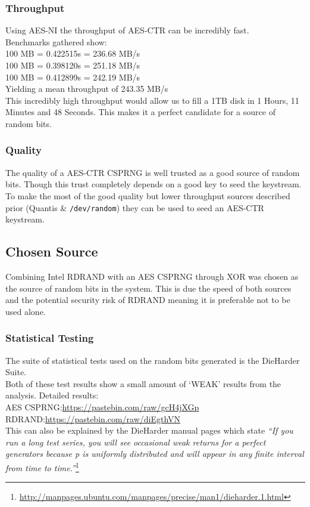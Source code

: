 \documentclass{paper}
\begin{document}
			\subsubsection{Throughput}
				Using AES-NI the throughput of AES-CTR can be incredibly fast.\\
				Benchmarks gathered show:\\
				100 MB = 0.422515s = 236.68 MB/s\\
				100 MB = 0.398120s = 251.18 MB/s\\
				100 MB = 0.412899s = 242.19 MB/s\\
				Yielding a mean throughput of 243.35 MB/s\\
				
				This incredibly high throughput would allow us to fill a 1TB disk in 1 Hours, 11 Minutes and 48 Seconds. This makes it a perfect candidate for a source of random bits.\\
			\subsubsection{Quality}
				The quality of a AES-CTR CSPRNG is well trusted as a good source of random bits. Though this trust completely depends on a good key to seed the keystream.\\
				To make the most of the good quality but lower throughput sources described prior (Quantis \& \texttt{/dev/random}) they can be used to seed an AES-CTR keystream.\\
			
		\subsection{Chosen Source}
			Combining Intel RDRAND with an AES CSPRNG through XOR was chosen as the source of random bits in the system. This is due the speed of both sources and the potential security risk of RDRAND meaning it is preferable not to be used alone.
			\subsubsection{Statistical Testing}
			The suite of statistical tests used on the random bits generated is the DieHarder Suite.\\  
			Both of these test results show a small amount of `WEAK' results from the analysis. Detailed results:\\ 
			AES CSPRNG:\url{https://pastebin.com/raw/gcH4jXGp}\\ RDRAND:\url{https://pastebin.com/raw/diEgthVN}\\
			This can also be explained by the DieHarder manual pages which state \textit{``If you run a long test series, you will see occasional weak returns for a perfect generators because p is uniformly distributed and will appear in any finite interval from time to time.''}\footnote{\url{http://manpages.ubuntu.com/manpages/precise/man1/dieharder.1.html}}
		
\end{document}
